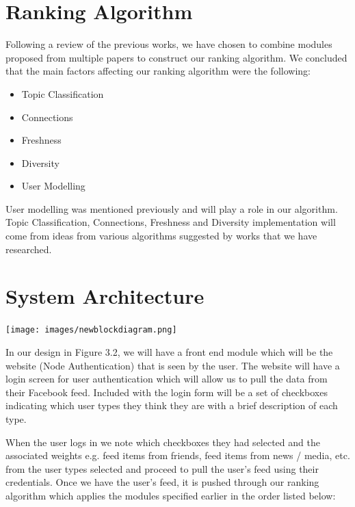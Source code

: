 \newpage
\section{Ranking Algorithm}

Following a review of the previous works, we have chosen to combine modules proposed from multiple papers to construct our ranking algorithm. We concluded that the main factors affecting our ranking algorithm were the following:

\begin{itemize}
	\item Topic Classification
	\item Connections
	\item Freshness
	\item Diversity
	\item User Modelling
\end{itemize}

User modelling was mentioned previously and will play a role in our algorithm. Topic Classification, Connections, Freshness and Diversity implementation will come from ideas from various algorithms suggested by works that we have researched. 

\newpage
\section{System Architecture}

\begin{center}
\texttt{[image: images/newblockdiagram.png]}
\end{center}

In our design in Figure 3.2, we will have a front end module which will be the website (Node Authentication) that is seen by the user. The website will have a login screen for user authentication which will allow us to pull the data from their Facebook feed. Included with the login form will be a set of checkboxes indicating which user types they think they are with a brief description of each type. 

When the user logs in we note which checkboxes they had selected and the associated weights e.g. feed items from friends, feed items from news / media, etc. from the user types selected and proceed to pull the user’s feed using their credentials. Once we have the user’s feed, it is pushed through our ranking algorithm which applies the modules specified earlier in the order listed below: 


